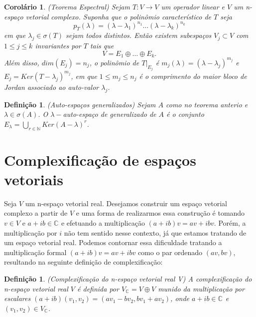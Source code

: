 \documentclass[12pt]{book}
\newtheorem{corolario}[teorema]{Corolário}
\newtheorem{definicao}[teorema]{Definição}
\newcommand{\complexificacao}[1]{#1_{\complexo{}}}
\newcommand{\complexo}[1]{\mathbb{C}^{#1}}
\begin{document}
	\begin{corolario}\label{teorema_espectral_jordan}
		(Teorema Espectral) Sejam $T:V \to V$ um operador linear e $V$ um n-espaço vetorial complexo. Suponha que o polinômio característico de $T$ seja
		$$
		p_{T}(\lambda) = (\lambda - \lambda_{1})^{n_{1}}\dots (\lambda - \lambda_{k})^{n_{k}}
		$$
		em que $\lambda_{j} \in \sigma(T)$ sejam todos distintos. Então existem subespaços $V_{j} \subset V$ com $1\leq j \leq k$ invariantes por $T$ tais que 
		$$
		V = E_{1}\oplus \dots \oplus E_{k}.
		$$
		Além disso, $dim(E_{j}) = n_{j}$,  o polinômio de $T|_{E_{j}}$ é $m_{j}(\lambda) = (\lambda - \lambda_{j})^{m_{j}}$ e $E_{j} = Ker(T-\lambda_{j})^{m_{j}}$, em que $1\leq m_{j}\leq n_{j}$ é o comprimento do maior bloco de Jordan associado ao auto-valor $\lambda_{j}$.
	\end{corolario}
	
	\begin{definicao}\label{definicao_autoespaco_generalizado}
		(Auto-espaços generalizados) Sejam $A$ como no teorema anterio e $\lambda \in \sigma(A)$. O $\lambda-$auto-espaço de generalizado de $A$ é o conjunto $E_{\lambda} = \bigcup_{r \in \mathbb{N}} Ker(A - \lambda)^{r}$.
	\end{definicao}
	
	\section{Complexificação de espaços vetoriais}
	
	Seja $V$ um n-espaço vetorial real. Desejamos construir um espaço vetorial complexo a partir de $V$ e uma forma de realizarmos essa construção é tomando $v \in V $ e $a+ib \in \complexo{}$ e efetuando a multiplicação $(a+ib)v = av+ibv$. Porém, a multiplicação por $i$ não tem sentido nesse contexto, já que estamos tratando de um espaço vetorial real. Podemos contornar essa dificuldade tratando a multiplicação formal $(a+ib)v = av+ibv$ como o par ordenado $(av, bv)$, resultando na seguinte definição de complexificação:
	
	\begin{definicao}
		(Complexificação do n-espaço vetorial real V) A complexificação do n-espaço vetorial real $V$ é definida por $\complexificacao{V}=V\oplus V$ munido da multiplicação por escalares $(a+ib)(v_{1}, v_{2}) = (av_{1}-bv_{2}, bv_{1}+ av_{2})$, onde $a+ib \in \complexo{}$ e $(v_{1}, v_{2})\in \complexificacao{V}$.
	\end{definicao}
	
\end{document}
